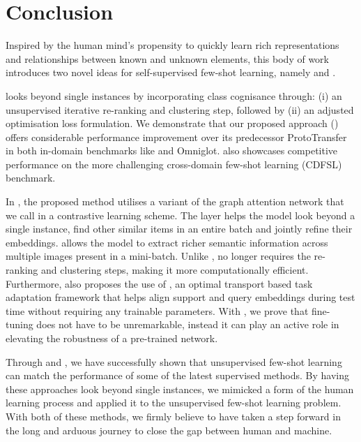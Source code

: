 \section{Conclusion}\label{label:discussion}
Inspired by the human mind's propensity to quickly learn rich representations and relationships
between known and unknown elements, this body of work introduces two novel ideas for self-supervised few-shot learning, namely \samptr{} and \ccclr{}. 

\ccclr{} looks beyond single instances by incorporating class cognisance through: (i) an unsupervised iterative re-ranking and clustering step, followed by (ii) an adjusted optimisation loss formulation. We demonstrate that our proposed approach (\ccclr{}) offers considerable performance improvement over its predecessor ProtoTransfer in both in-domain benchmarks like \miniImagenet{} and Omniglot. \ccclr{} also showcases competitive performance on the more challenging cross-domain few-shot learning (CDFSL) benchmark.

In \samptr{}, the proposed method utilises a variant of the graph attention network that we call \samp{} in a contrastive learning scheme. The \samp{} layer helps the model look beyond a single instance, find other similar items in an entire batch and jointly refine their embeddings. \samp{} allows the model to extract richer semantic information across multiple images present in a mini-batch. Unlike \ccclr{}, \samptr{} no longer requires the re-ranking and clustering steps, making it more computationally efficient.
Furthermore, \samptr{} also proposes the use of \opttune{}, an optimal transport based task adaptation framework that helps align support and query embeddings during test time without requiring any trainable parameters. With \opttune{}, we prove that fine-tuning does not have to be unremarkable, instead it can play an active role in elevating the robustness of a pre-trained network.

Through \samptr{} and \ccclr{}, we have successfully shown that unsupervised few-shot learning can match the performance of some of the latest supervised methods. By having these approaches look beyond single instances, we mimicked a form of the human learning process and applied it to the unsupervised few-shot learning problem.
With both of these methods, we firmly believe to have taken a step forward in the long and arduous journey to close the gap between human and machine.